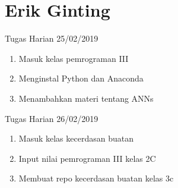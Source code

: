 \chapter{Erik Ginting}

Tugas Harian 25/02/2019
\begin{enumerate}
  \item Masuk kelas pemrograman III
  \item Menginstal Python dan Anaconda
  \item Menambahkan materi tentang ANNs
\end{enumerate}

Tugas Harian 26/02/2019
\begin{enumerate}
  \item Masuk kelas kecerdasan  buatan
  \item Input nilai pemrograman III kelas 2C
  \item Membuat repo kecerdasan buatan kelas 3c
\end{enumerate}


